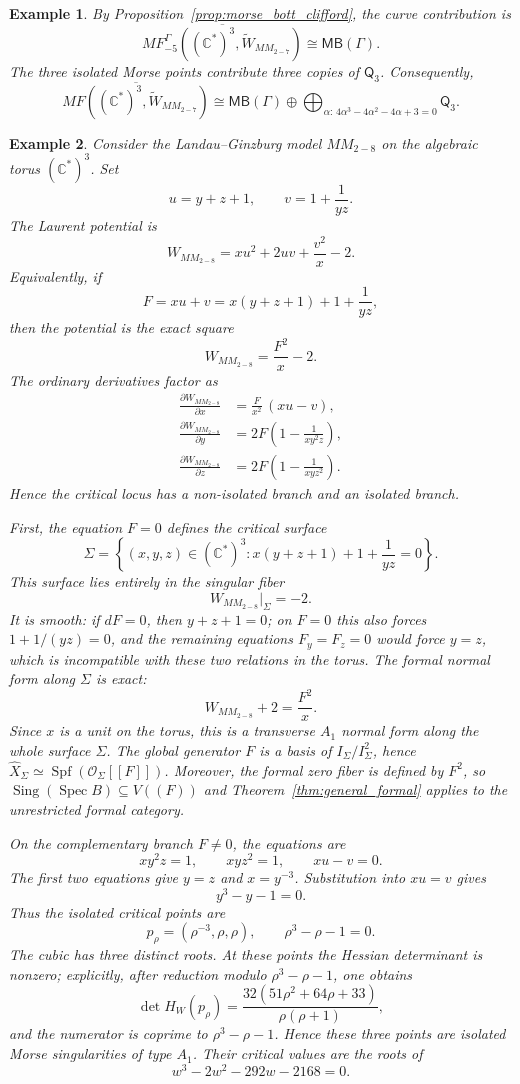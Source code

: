 \documentclass[11pt]{amsart}
\newtheorem{example}{Example}[section]
\DeclareMathOperator{\Sing}{Sing}
\newcommand{\MorseCat}[1]{\mathsf{Q}_{#1}}
\newcommand{\MBcat}[1]{\mathsf{MB}(#1)}
\begin{document}
\begin{example}
By Proposition~\ref{prop:morse_bott_clifford}, the curve contribution is
\[
\overline{MF^{\Gamma}_{-5}((\mathbb{C}^*)^3,\widetilde W_{MM_{2-7}})}
\cong \MBcat{\Gamma}.
\]
The three isolated Morse points contribute three copies of $\MorseCat{3}$.
Consequently,
\[
\overline{MF((\mathbb{C}^*)^3,\widetilde W_{MM_{2-7}})}
\cong \MBcat{\Gamma}\oplus\bigoplus_{\alpha:\,4\alpha^3-4\alpha^2-4\alpha+3=0}\MorseCat{3}.
\]
\end{example}

\begin{example}
Consider the Landau--Ginzburg model $MM_{2-8}$ on the algebraic torus
$(\mathbb{C}^*)^3$. Set
\[
u=y+z+1,
\qquad
v=1+\frac{1}{yz}.
\]
The Laurent potential is
\[
W_{MM_{2-8}}=xu^2+2uv+\frac{v^2}{x}-2.
\]
Equivalently, if
\[
F=xu+v=x(y+z+1)+1+\frac{1}{yz},
\]
then the potential is the exact square
\[
W_{MM_{2-8}}=\frac{F^2}{x}-2.
\]
The ordinary derivatives factor as
\begin{align*}
\frac{\partial W_{MM_{2-8}}}{\partial x}
&=\frac{F}{x^2}\,(xu-v),\\
\frac{\partial W_{MM_{2-8}}}{\partial y}
&=2F\left(1-\frac{1}{xy^2z}\right),\\
\frac{\partial W_{MM_{2-8}}}{\partial z}
&=2F\left(1-\frac{1}{xyz^2}\right).
\end{align*}
Hence the critical locus has a non-isolated branch and an isolated branch.

First, the equation $F=0$ defines the critical surface
\[
\Sigma=\left\{(x,y,z)\in(\mathbb{C}^*)^3:
x(y+z+1)+1+\frac{1}{yz}=0\right\}.
\]
This surface lies entirely in the singular fiber
\[
W_{MM_{2-8}}|_{\Sigma}=-2.
\]
It is smooth: if $dF=0$, then $y+z+1=0$; on $F=0$ this also forces
$1+1/(yz)=0$, and the remaining equations $F_y=F_z=0$ would force $y=z$, which
is incompatible with these two relations in the torus. The formal normal form
along $\Sigma$ is exact:
\[
W_{MM_{2-8}}+2=\frac{F^2}{x}.
\]
Since $x$ is a unit on the torus, this is a transverse $A_1$ normal form along
the whole surface $\Sigma$. The global generator $F$ is a basis of
$I_\Sigma/I_\Sigma^2$, hence
$\widehat X_\Sigma\simeq\operatorname{Spf}(\mathcal O_\Sigma[[F]])$.
Moreover, the formal zero fiber is defined by $F^2$, so
$\Sing(\operatorname{Spec}B)\subseteq V((F))$ and
Theorem~\ref{thm:general_formal} applies to the unrestricted formal category.

On the complementary branch $F\neq0$, the equations are
\[
xy^2z=1,
\qquad
xyz^2=1,
\qquad
xu-v=0.
\]
The first two equations give $y=z$ and $x=y^{-3}$. Substitution into $xu=v$
gives
\[
y^3-y-1=0.
\]
Thus the isolated critical points are
\[
p_{\rho}=\left(\rho^{-3},\rho,\rho\right),
\qquad
\rho^3-\rho-1=0.
\]
The cubic has three distinct roots. At these points the Hessian determinant is
nonzero; explicitly, after reduction modulo $\rho^3-\rho-1$, one obtains
\[
\det H_W(p_{\rho})=\frac{32(51\rho^2+64\rho+33)}{\rho(\rho+1)},
\]
and the numerator is coprime to $\rho^3-\rho-1$. Hence these three points are
isolated Morse singularities of type $A_1$. Their critical values are the roots
of
\[
w^3-2w^2-292w-2168=0.
\]


\end{example}
\end{document}
